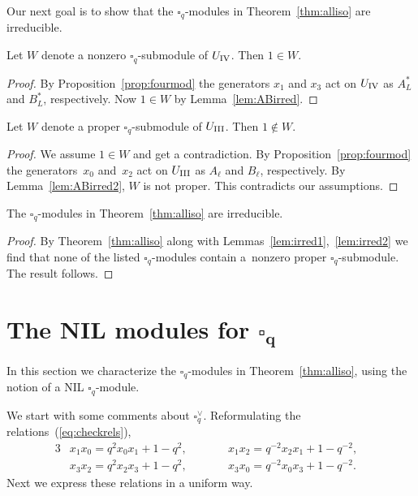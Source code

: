 Our next goal is to show that the $\square_q$-modules in Theorem~\ref{thm:alliso} are irreducible.

\begin{Lemma} \label{lem:irred1}Let $W$ denote a nonzero $\square_q$-submodule of $U_{\rm IV}$. Then $1 \in W$.
\end{Lemma}
\begin{proof}By Proposition~\ref{prop:fourmod} the generators $x_1$ and $x_3$ act on $U_{\rm IV}$ as $A^*_L$ and $B^*_L$, respectively. Now $1 \in W$ by Lemma~\ref{lem:ABirred}.
\end{proof}

\begin{Lemma}\label{lem:irred2}Let $W$ denote a proper $\square_q$-submodule of $U_{\rm III}$. Then $1 \not\in W$.
\end{Lemma}
\begin{proof}We assume $1 \in W$ and get a contradiction. By Proposition~\ref{prop:fourmod} the genera\-tors~$x_0$ and~$x_2$ act on $U_{\rm III}$ as $A_\ell$ and $B_\ell$, respectively. By Lemma~\ref{lem:ABirred2}, $W$ is not proper. This contradicts our assumptions.
\end{proof}

\begin{Theorem}\label{thm:allirred}The $\square_q$-modules in Theorem~{\rm \ref{thm:alliso}} are irreducible.
\end{Theorem}
\begin{proof} By Theorem~\ref{thm:alliso} along with Lemmas~\ref{lem:irred1},~\ref{lem:irred2} we find that
none of the listed $\square_q$-modules contain a~nonzero proper $\square_q$-submodule. The result follows.
\end{proof}

\section[The NIL modules for $\square_q$]{The NIL modules for $\boldsymbol{\square_q}$}\label{section15}

In this section we characterize the $\square_q$-modules in Theorem~\ref{thm:alliso}, using the notion of a NIL $\square_q$-module.

We start with some comments about $\square^\vee_q$. Reformulating the relations~(\ref{eq:checkrels}),
\begin{alignat*}{3}
&x_1 x_0 = q^2 x_0 x_1 + 1-q^2, \qquad && x_1 x_2 = q^{-2} x_ 2x_1 + 1-q^{-2},&\\
&x_3 x_2 = q^2 x_2 x_3 + 1-q^2, \qquad && x_3 x_0 = q^{-2} x_0 x_3 + 1-q^{-2}.&
\end{alignat*}
Next we express these relations in a uniform way.

